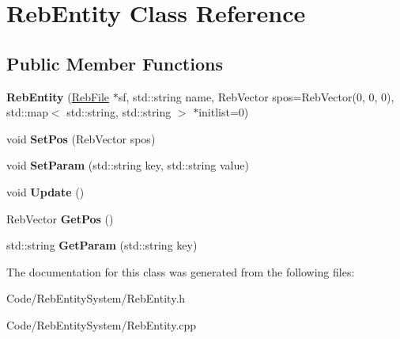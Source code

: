 \hypertarget{class_reb_entity}{}\section{Reb\+Entity Class Reference}
\label{class_reb_entity}
\subsection*{Public Member Functions}
\begin{DoxyCompactItemize}
\item 
{\bfseries Reb\+Entity} (\hyperlink{class_reb_file}{Reb\+File} $\ast$sf, std\+::string name, Reb\+Vector spos=Reb\+Vector(0, 0, 0), std\+::map$<$ std\+::string, std\+::string $>$ $\ast$initlist=0)\hypertarget{class_reb_entity_a20bf721e729214ef43b8e99d1efbba55}{}\label{class_reb_entity_a20bf721e729214ef43b8e99d1efbba55}

\item 
void {\bfseries Set\+Pos} (Reb\+Vector spos)\hypertarget{class_reb_entity_ab1512f8c9894fdc03b7cec53d1d2660b}{}\label{class_reb_entity_ab1512f8c9894fdc03b7cec53d1d2660b}

\item 
void {\bfseries Set\+Param} (std\+::string key, std\+::string value)\hypertarget{class_reb_entity_a17c456928d4f201c550a6873c24d868c}{}\label{class_reb_entity_a17c456928d4f201c550a6873c24d868c}

\item 
void {\bfseries Update} ()\hypertarget{class_reb_entity_af496e1efac2571e4664f34e143924e2b}{}\label{class_reb_entity_af496e1efac2571e4664f34e143924e2b}

\item 
Reb\+Vector {\bfseries Get\+Pos} ()\hypertarget{class_reb_entity_a063f4b44ded0e413ac665cd847f8c4df}{}\label{class_reb_entity_a063f4b44ded0e413ac665cd847f8c4df}

\item 
std\+::string {\bfseries Get\+Param} (std\+::string key)\hypertarget{class_reb_entity_ae1b1310baf5c6e6bb4adbc98862ec93d}{}\label{class_reb_entity_ae1b1310baf5c6e6bb4adbc98862ec93d}

\end{DoxyCompactItemize}


The documentation for this class was generated from the following files\+:\begin{DoxyCompactItemize}
\item 
Code/\+Reb\+Entity\+System/Reb\+Entity.\+h\item 
Code/\+Reb\+Entity\+System/Reb\+Entity.\+cpp\end{DoxyCompactItemize}
